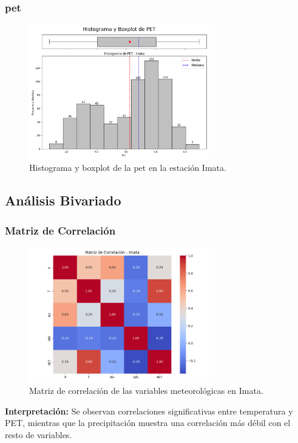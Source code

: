 \subsubsection*{\gls{pet} }
\begin{figure}[htbp]
\centering
\includegraphics[width=0.7\textwidth]{resultados/por_estacion_meteorologica/Imata/PET_histograma.png}
\caption{Histograma y boxplot de la \gls{pet}  en la estación Imata.}
\label{fig:imata_PET}
\end{figure}

\subsection{Análisis Bivariado}

\subsubsection*{Matriz de Correlación}
\begin{figure}[htbp]
\centering
\includegraphics[width=0.7\textwidth]{resultados/por_estacion_meteorologica/Imata/matriz_correlacion.png}
\caption{Matriz de correlación de las variables meteorológicas en Imata.}
\label{fig:imata_corr}
\end{figure}
\textbf{Interpretación:} Se observan correlaciones significativas entre temperatura y PET, mientras que la precipitación muestra una correlación más débil con el resto de variables.


